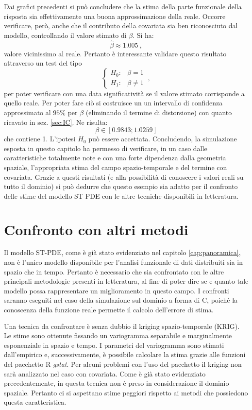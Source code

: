 \documentclass[a4paper,11pt,twoside,openright]{book}							%
\begin{document}
Dai grafici precedenti si può concludere che la stima della parte funzionale della risposta sia effettivamente una buona approssimazione della reale. Occorre verificare, però, anche che il contributo della covariata sia ben riconosciuto dal modello, controllando il valore stimato di $\beta$. Si ha:
$$
\hat{\beta} \approx 1.005 \ ,
$$
valore vicinissimo al reale. Pertanto è interessante validare questo risultato attraverso un test del tipo
$$
\begin{cases}
H_0: & \beta=1 \\
H_1: & \beta \not = 1
\end{cases} \ ,
$$
per poter verificare con una data significatività se il valore stimato corrisponde a quello reale. Per poter fare ciò si costruisce un un intervallo di confidenza approssimato al $95\%$ per $\beta$ (eliminando il termine di distorsione) con quanto ricavato in sez. \ref{sec:IC}. Ne risulta:
$$
\beta \in [0.9843;1.0259]
$$
che contiene 1. L'ipotesi $H_0$ può essere accettata.
\newpage
Concludendo, la simulazione esposta in questo capitolo ha permesso di verificare, in un caso dalle caratteristiche totalmente note e con una forte dipendenza dalla geometria spaziale, l'appropriata stima del campo spazio-temporale e del termine con covariata. Grazie a questi risultati (e alla possibilità di conoscere i valori reali su tutto il dominio) si può dedurre che questo esempio sia adatto per il confronto delle stime del modello ST-PDE con le altre tecniche disponibili in letteratura.
\newpage
\thispagestyle{empty}

\chapter{Confronto con altri metodi}
\label{cap:confronto}

Il modello ST-PDE, come è già stato evidenziato nel capitolo \ref{cap:panoramica}, non è l'unico modello disponibile per l'analisi funzionale di dati distribuiti sia in spazio che in tempo. Pertanto è necessario che sia confrontato con le altre principali metodologie presenti in letteratura, al fine di poter dire se e quanto tale modello possa rappresentare un miglioramento in questo campo. I confronti saranno eseguiti nel caso della simulazione sul dominio a forma di C, poiché la conoscenza della funzione reale permette il calcolo dell'errore di stima. 

Una tecnica da confrontare è senza dubbio il kriging spazio-temporale (KRIG). Le stime sono ottenute fissando un variogramma separabile e marginalmente esponenziale in spazio e tempo. I parametri del variogramma sono stimati dall'empirico e, successivamente, è possibile calcolare la stima grazie alle funzioni del pacchetto R \textit{gstat}. Per alcuni problemi con l'uso del pacchetto il kriging non sarà analizzato nel caso con covariata. Come è già stato evidenziato precedentemente, in questa tecnica non è preso in considerazione il dominio spaziale. Pertanto ci si aspettano stime peggiori rispetto ai metodi che possiedono questa caratteristica.
\end{document}
